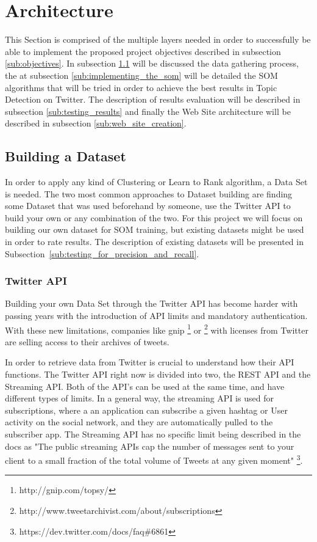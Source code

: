
\section{Architecture} %
\label{sec:architecture}
This Section is comprised of the multiple layers needed in order to successfully be able to implement the proposed project objectives described in subsection \ref{sub:objectives}. In subsection \ref{sub:data_gathering} will be discussed the data gathering process, the at subsection \ref{sub:implementing_the_som} will be detailed the SOM algorithms that will be tried in order to achieve the best results in Topic Detection on Twitter. The description of results evaluation will be described in subsection \ref{sub:testing_results} and finally the Web Site architecture will be described in subsection \ref{sub:web_site_creation}.

\subsection{Building a Dataset} %
\label{sub:data_gathering}
In order to apply any kind of Clustering or Learn to Rank algorithm, a Data Set is needed. The two most common approaches to Dataset building are finding some Dataset that was used beforehand by someone, use the Twitter API to build your own or any combination of the two. For this project we will focus on building our own dataset for SOM training, but existing datasets might be used in order to rate results. The description of existing datasets will be presented in Subsection~\ref{sub:testing_for_precision_and_recall}. 

\subsubsection{Twitter API} %
 \label{ssub:building_a_data_set}
 Building your own Data Set through the Twitter API has become harder with passing years with the introduction of API limits and mandatory authentication. With these new limitations, companies like gnip \footnote{http://gnip.com/topsy/} or \footnote{http://www.tweetarchivist.com/about/subscriptions} with licenses from Twitter are selling access to their archives of tweets.

 In order to retrieve data from Twitter is crucial to understand how their API functions. The Twitter API right now is divided into two, the REST API and the Streaming API. Both of the API's can be used at the same time, and have different types of limits. In a general way, the streaming API is used for subscriptions, where a an application can subscribe a given hashtag or User activity on the social network, and they are automatically pulled to the subscriber app. The Streaming API has no specific limit being described in the docs as "The public streaming APIs cap the number of messages sent to your client to a small fraction of the total volume of Tweets at any given moment" \footnote{https://dev.twitter.com/docs/faq\#6861}.

